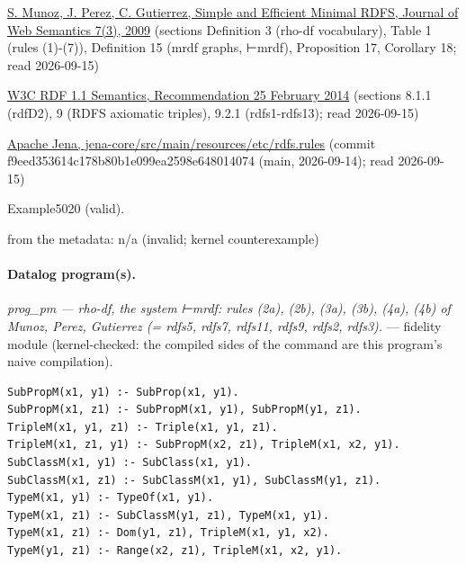 \documentclass[10pt]{article}
\begin{document}
\begin{description}[leftmargin=2.6cm,style=nextline,itemsep=1pt]
\item[Sources] {\raggedright \href{https://doi.org/10.1016/j.websem.2009.07.003}{S. Munoz, J. Perez, C. Gutierrez, Simple and Efficient Minimal RDFS, Journal of Web Semantics 7(3), 2009} (sections Definition 3 (rho-df vocabulary), Table 1 (rules (1)-(7)), Definition 15 (mrdf graphs, ⊢mrdf), Proposition 17, Corollary 18; read 2026-09-15) \par \href{https://www.w3.org/TR/rdf11-mt/}{W3C RDF 1.1 Semantics, Recommendation 25 February 2014} (sections 8.1.1 (rdfD2), 9 (RDFS axiomatic triples), 9.2.1 (rdfs1-rdfs13); read 2026-09-15) \par \href{https://github.com/apache/jena/blob/main/jena-core/src/main/resources/etc/rdfs.rules}{Apache Jena, jena-core/src/main/resources/etc/rdfs.rules} (commit f9eed353614c178b80b1e099ea2598e648014074 (main, 2026-09-14); read 2026-09-15)\par}

\item[Twin] Example5020 (valid).

\item[Obstruction note] from the metadata: n/a (invalid; kernel counterexample)

\end{description}

\paragraph{Datalog program(s).}

{\raggedright\textit{prog\_pm --- rho-df, the system ⊢mrdf: rules (2a), (2b), (3a), (3b), (4a), (4b) of Munoz, Perez, Gutierrez (= rdfs5, rdfs7, rdfs11, rdfs9, rdfs2, rdfs3).} --- fidelity module (kernel-checked: the compiled sides of the command are this program's naive compilation).\par}

\begin{Verbatim}[fontsize=\scriptsize,breaklines=true,breakanywhere=true,frame=single,framesep=1.5mm]
SubPropM(x1, y1) :- SubProp(x1, y1).
SubPropM(x1, z1) :- SubPropM(x1, y1), SubPropM(y1, z1).
TripleM(x1, y1, z1) :- Triple(x1, y1, z1).
TripleM(x1, z1, y1) :- SubPropM(x2, z1), TripleM(x1, x2, y1).
SubClassM(x1, y1) :- SubClass(x1, y1).
SubClassM(x1, z1) :- SubClassM(x1, y1), SubClassM(y1, z1).
TypeM(x1, y1) :- TypeOf(x1, y1).
TypeM(x1, z1) :- SubClassM(y1, z1), TypeM(x1, y1).
TypeM(x1, z1) :- Dom(y1, z1), TripleM(x1, y1, x2).
TypeM(y1, z1) :- Range(x2, z1), TripleM(x1, x2, y1).
\end{Verbatim}
\end{document}
